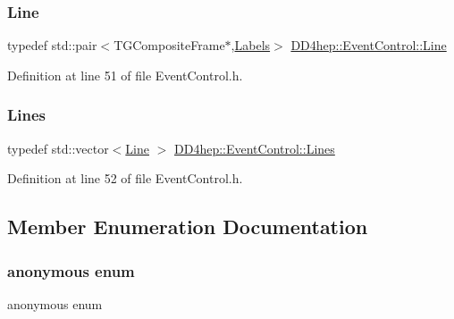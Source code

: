 \subsubsection{\texorpdfstring{Line}{Line}}
{\footnotesize\ttfamily typedef std\+::pair$<$T\+G\+Composite\+Frame$\ast$,\hyperlink{class_d_d4hep_1_1_event_control_a12b653cc77607d8916f8a5ec009036ed}{Labels}$>$ \hyperlink{class_d_d4hep_1_1_event_control_a8195e2f8755ede7627abeaaacd0155e2}{D\+D4hep\+::\+Event\+Control\+::\+Line}\hspace{0.3cm}{\ttfamily [private]}}



Definition at line 51 of file Event\+Control.\+h.

\hypertarget{class_d_d4hep_1_1_event_control_a662fec8b3e1e89af1cf704e41cb7df78}{}\label{class_d_d4hep_1_1_event_control_a662fec8b3e1e89af1cf704e41cb7df78} 
\subsubsection{\texorpdfstring{Lines}{Lines}}
{\footnotesize\ttfamily typedef std\+::vector$<$\hyperlink{class_d_d4hep_1_1_event_control_a8195e2f8755ede7627abeaaacd0155e2}{Line} $>$ \hyperlink{class_d_d4hep_1_1_event_control_a662fec8b3e1e89af1cf704e41cb7df78}{D\+D4hep\+::\+Event\+Control\+::\+Lines}\hspace{0.3cm}{\ttfamily [private]}}



Definition at line 52 of file Event\+Control.\+h.



\subsection{Member Enumeration Documentation}
\hypertarget{class_d_d4hep_1_1_event_control_a9a7c581934b4dff35b3753b630b15f74}{}\label{class_d_d4hep_1_1_event_control_a9a7c581934b4dff35b3753b630b15f74} 
\subsubsection{\texorpdfstring{anonymous enum}{anonymous enum}}
{\footnotesize\ttfamily anonymous enum\hspace{0.3cm}{\ttfamily [private]}}

